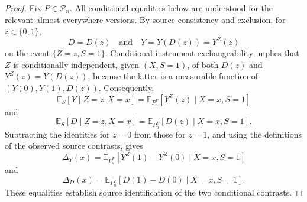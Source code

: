 \documentclass{article}
\begin{document}
\begin{proof}
Fix \(P\in\mathcal P_n\). All conditional equalities below are understood for the relevant almost-everywhere versions. By source consistency and exclusion, for \(z\in\{0,1\}\),
\[
D=D(z)\quad\text{and}\quad Y=Y(D(z))=Y^Z(z)
\]
on the event \(\{Z=z,S=1\}\). Conditional instrument exchangeability implies that \(Z\) is conditionally independent, given \((X,S=1)\), of both \(D(z)\) and \(Y^Z(z)=Y(D(z))\), because the latter is a measurable function of \((Y(0),Y(1),D(z))\). Consequently,
\[
\mathbb E_S[Y\mid Z=z,X=x]
 =\mathbb E_{P_n^F}[Y^Z(z)\mid X=x,S=1]
\]
and
\[
\mathbb E_S[D\mid Z=z,X=x]
 =\mathbb E_{P_n^F}[D(z)\mid X=x,S=1].
\]
Subtracting the identities for \(z=0\) from those for \(z=1\), and using the definitions of the observed source contrasts, gives
\[
\Delta_Y(x)=\mathbb E_{P_n^F}[Y^Z(1)-Y^Z(0)\mid X=x,S=1]
\]
and
\[
\Delta_D(x)=\mathbb E_{P_n^F}[D(1)-D(0)\mid X=x,S=1].
\]
These equalities establish source identification of the two conditional contrasts.


\end{proof}
\end{document}
